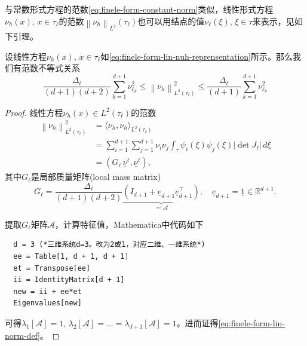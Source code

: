 与常数形式方程的范数\eqref{eq:finele-form-constant-norm}类似，线性形式方程$\nu_{h}(x), \, x \in \tau_{\ell}$的范数$\left\| \nu_{h} \right\|_{L^{2}} \left(\tau_{\ell} \right)$也可以用结点的值$\nu_{\ell}(\xi), \, \xi \in \tau$来表示，见如下引理。
\begin{lemma}[线性形式方程的范数]
  \label{lemma:finele-form-lin-norm-def}
  设线性方程$\nu_{h}(x), \, x \in \tau_{\ell}$如\eqref{eq:finele-form-lin-nuh-reprensentation}所示。那么我们有范数不等式关系
  \begin{equation}
    \label{eq:finele-form-lin-norm-def}
    \frac{\Delta_{\ell}}{\left( d+1 \right) \left( d+2 \right)}
    \sum_{k=1}^{d+1} \nu_{\ell_{k}}^{2}
    \le \left\| \nu_{h} \right\|_{L^{2}(\tau_{\ell})}^{2}
    \le \frac{\Delta_{\ell}}{\left( d+1 \right)}
    \sum_{k=1}^{d+1} \nu_{\ell_{k}}^{2}
  \end{equation}
\end{lemma}
\begin{proof}
  线性方程$\nu_{h}(x) \in L^{2}(\tau_{\ell})$的范数
  \begin{equation*}
    \begin{split}
      \left\| \nu_{h} \right\|_{L^{2}(\tau_{\ell})}^{2}
      & = \langle \nu_{h}, \nu_{h} \rangle_{L^{2}(\tau_{\ell})} \\
      & = \sum_{i=1}^{d+1} \sum_{j=1}^{d+1} \nu_{i} \nu_{j}
      \int_{\tau} \psi_{i}\left( \xi \right) \psi_{j}\left( \xi \right) \left| \det J_{\ell} \right| \, d \xi \\
      & = \left( G_{\ell} \, \underline{\nu}^{\ell}, \underline{\nu}^{\ell} \right),
    \end{split}
  \end{equation*}
  其中$G_{\ell}$是局部质量矩阵(local mass matrix)
  \begin{equation*}
    G_{\ell} = \frac{
    \Delta_{\ell}
    }{
    \left( d + 1 \right)\left( d + 2 \right)}
    \underbrace{
    \left(
    I_{d+1} + \underline{e}_{d+1} \underline{e}_{d+1}^{\top}
    \right)
    }_{\eqqcolon \mathcal{A}}
    , \quad \underline{e}_{d+1} = \underline{1} \in \mathbb{R}^{d+1}.
  \end{equation*}

提取$G_{\ell}$矩阵$\mathcal{A}$，计算特征值，Mathematica中代码如下
\begin{verbatim}
  d = 3 (*三维系统d=3。改为2或1，对应二维、一维系统*)
  ee = Table[1, d + 1, d + 1]
  et = Transpose[ee]
  ii = IdentityMatrix[d + 1]
  new = ii + ee*et
  Eigenvalues[new]
\end{verbatim}
可得$\lambda_{1}\left[ \mathcal{A} \right]=1, \, \lambda_{2}\left[ \mathcal{A} \right] = \ldots = \lambda_{d+1} \left[ \mathcal{A} \right] =1$。进而证得\eqref{eq:finele-form-lin-norm-def}。
\end{proof}


